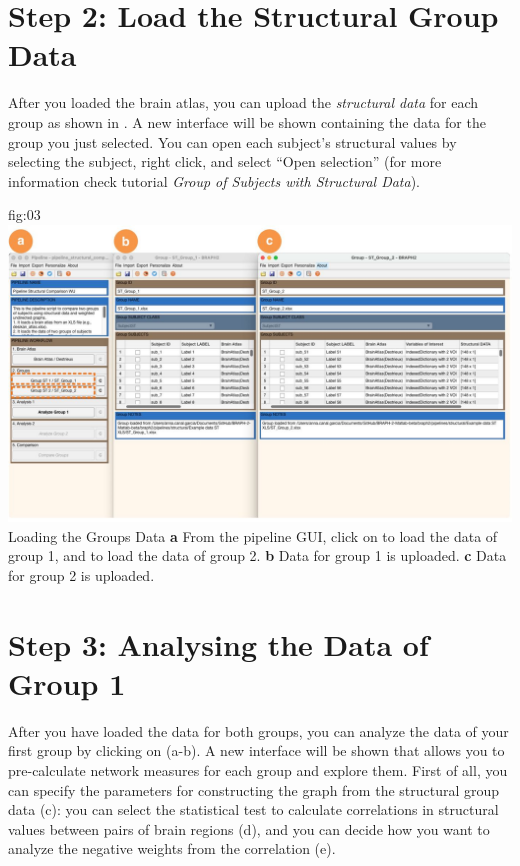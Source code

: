 \documentclass[justified]{tufte-handout}
\begin{document}
\section{Step 2: Load the Structural Group Data}

After you loaded the brain atlas, you can upload the \emph{structural data} for each group as shown in . A new interface will be shown containing the data for the group you just selected. You can open each subject’s structural values by selecting
the subject, right click, and select “Open selection” (for more information check tutorial \emph{Group of Subjects with Structural Data}).
	
	{fig:03}
	{
	\includegraphics{fig03.jpg}
	}
	{Loading the Groups Data}
	{
	{\bf a} From the pipeline GUI, click on  to load the data of group 1, and  to load the data of group 2.
	{\bf b} Data for group 1 is uploaded. {\bf c} Data for group 2 is uploaded.
	}

\section{Step 3: Analysing the Data of Group 1}
 
After you have loaded the data for both groups, you can analyze the data of your first group by clicking on  (a-b). A new interface will be shown that allows you to pre-calculate network measures for each group and explore them. First of all, you can specify the parameters for constructing the graph from the structural group data (c): you can select the statistical test to calculate correlations in structural values between pairs of brain regions (d), and you can decide how you want to analyze the negative weights from the correlation (e). 
\end{document}
